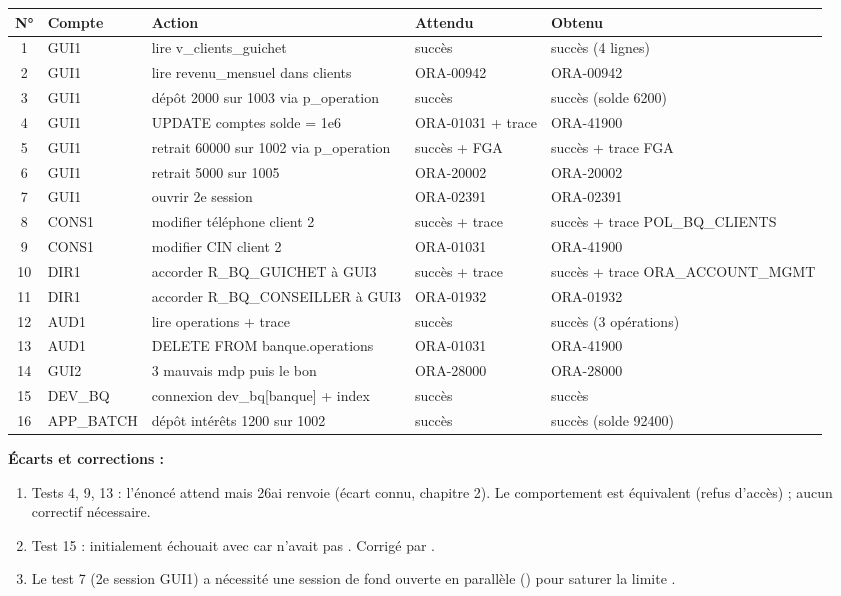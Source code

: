 \begin{center}
\small
\begin{tabular}{|c|l|l|l|l|}
\hline
\textbf{N°} & \textbf{Compte} & \textbf{Action} & \textbf{Attendu} & \textbf{Obtenu} \\
\hline
1 & GUI1 & lire v\_clients\_guichet & succès & succès (4 lignes) \\
\hline
2 & GUI1 & lire revenu\_mensuel dans clients & ORA-00942 & ORA-00942 \\
\hline
3 & GUI1 & dépôt 2000 sur 1003 via p\_operation & succès & succès (solde 6200) \\
\hline
4 & GUI1 & UPDATE comptes solde = 1e6 & ORA-01031 + trace & ORA-41900 \\
\hline
5 & GUI1 & retrait 60000 sur 1002 via p\_operation & succès + FGA & succès + trace FGA \\
\hline
6 & GUI1 & retrait 5000 sur 1005 & ORA-20002 & ORA-20002 \\
\hline
7 & GUI1 & ouvrir 2e session & ORA-02391 & ORA-02391 \\
\hline
8 & CONS1 & modifier téléphone client 2 & succès + trace & succès + trace POL\_BQ\_CLIENTS \\
\hline
9 & CONS1 & modifier CIN client 2 & ORA-01031 & ORA-41900 \\
\hline
10 & DIR1 & accorder R\_BQ\_GUICHET à GUI3 & succès + trace & succès + trace ORA\_ACCOUNT\_MGMT \\
\hline
11 & DIR1 & accorder R\_BQ\_CONSEILLER à GUI3 & ORA-01932 & ORA-01932 \\
\hline
12 & AUD1 & lire operations + trace & succès & succès (3 opérations) \\
\hline
13 & AUD1 & DELETE FROM banque.operations & ORA-01031 & ORA-41900 \\
\hline
14 & GUI2 & 3 mauvais mdp puis le bon & ORA-28000 & ORA-28000 \\
\hline
15 & DEV\_BQ & connexion dev\_bq[banque] + index & succès & succès \\
\hline
16 & APP\_BATCH & dépôt intérêts 1200 sur 1002 & succès & succès (solde 92400) \\
\hline
\end{tabular}
\end{center}

\textbf{Écarts et corrections :}
\begin{enumerate}
  \item Tests 4, 9, 13 : l'énoncé attend  mais 26ai renvoie
         (écart connu, chapitre 2).
        Le comportement est équivalent (refus d'accès) ; aucun correctif nécessaire.
  \item Test 15 : initialement échouait avec  car  n'avait
        pas . Corrigé par .
  \item Le test 7 (2e session GUI1) a nécessité une session de fond ouverte en parallèle
        () pour saturer la limite .
\end{enumerate}

